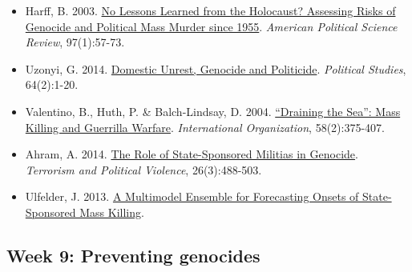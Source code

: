 \documentclass[12pt,]{article}
\providecommand{\tightlist}{%
  \setlength{\itemsep}{0pt}\setlength{\parskip}{0pt}}
\begin{document}
\begin{itemize}
\tightlist
\item
  Harff, B. 2003.
  \href{https://www.cambridge.org/core/journals/american-political-science-review/article/no-lessons-learned-from-the-holocaust-assessing-risks-of-genocide-and-political-mass-murder-since-1955/FBA37FA563AC35E1CB6F7B57F8140F2C}{No
  Lessons Learned from the Holocaust? Assessing Risks of Genocide and
  Political Mass Murder since 1955}. \emph{American Political Science
  Review}, 97(1):57-73.
\item
  Uzonyi, G. 2014.
  \href{http://journals.sagepub.com/doi/abs/10.1111/1467-9248.12181}{Domestic
  Unrest, Genocide and Politicide}. \emph{Political Studies},
  64(2):1-20.
\item
  Valentino, B., Huth, P. \& Balch-Lindsay, D. 2004.
  \href{https://www.cambridge.org/core/journals/international-organization/article/draining-the-sea-mass-killing-and-guerrilla-warfare/A4DD186DD876B363754AD358B8148014}{``Draining
  the Sea'': Mass Killing and Guerrilla Warfare}. \emph{International
  Organization}, 58(2):375-407.
\item
  Ahram, A. 2014.
  \href{https://www.tandfonline.com/doi/abs/10.1080/09546553.2012.734875}{The
  Role of State-Sponsored Militias in Genocide}. \emph{Terrorism and
  Political Violence}, 26(3):488-503.
\item
  Ulfelder, J. 2013.
  \href{https://papers.ssrn.com/sol3/papers.cfm?abstract_id=2303048}{A
  Multimodel Ensemble for Forecasting Onsets of State-Sponsored Mass
  Killing}.
\end{itemize}

\hypertarget{week-9-preventing-genocides}{%
\subsection{Week 9: Preventing
genocides}\label{week-9-preventing-genocides}}
\end{document}
